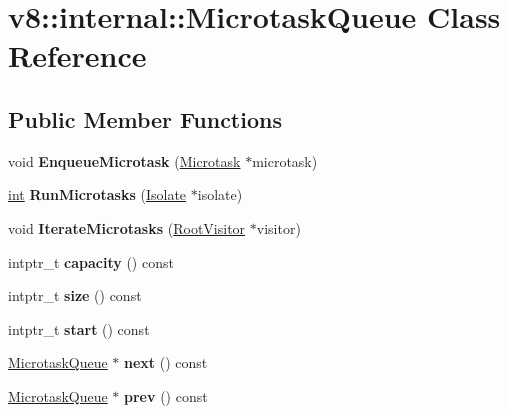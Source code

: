 \hypertarget{classv8_1_1internal_1_1MicrotaskQueue}{}\section{v8\+:\+:internal\+:\+:Microtask\+Queue Class Reference}
\label{classv8_1_1internal_1_1MicrotaskQueue}
\subsection*{Public Member Functions}
\begin{DoxyCompactItemize}
\item 
\mbox{\label{classv8_1_1internal_1_1MicrotaskQueue_a87e0bb654aeae8da494dfeb14d7a64e0}} 
void {\bfseries Enqueue\+Microtask} (\mbox{\hyperlink{classv8_1_1internal_1_1Microtask}{Microtask}} $\ast$microtask)
\item 
\mbox{\label{classv8_1_1internal_1_1MicrotaskQueue_aaa0dc3795c313ffa164da19dd50f4fc2}} 
\mbox{\hyperlink{classint}{int}} {\bfseries Run\+Microtasks} (\mbox{\hyperlink{classv8_1_1internal_1_1Isolate}{Isolate}} $\ast$isolate)
\item 
\mbox{\label{classv8_1_1internal_1_1MicrotaskQueue_a8d4d95ab5c39f431f2c7d2d98688beab}} 
void {\bfseries Iterate\+Microtasks} (\mbox{\hyperlink{classv8_1_1internal_1_1RootVisitor}{Root\+Visitor}} $\ast$visitor)
\item 
\mbox{\label{classv8_1_1internal_1_1MicrotaskQueue_a5cd348b62cdd9f017c609d039fcd1308}} 
intptr\+\_\+t {\bfseries capacity} () const
\item 
\mbox{\label{classv8_1_1internal_1_1MicrotaskQueue_a7209bf6df85bdc067b3dc73261ef355a}} 
intptr\+\_\+t {\bfseries size} () const
\item 
\mbox{\label{classv8_1_1internal_1_1MicrotaskQueue_aaa3648a97cbb8c0b94581d6404ee7c37}} 
intptr\+\_\+t {\bfseries start} () const
\item 
\mbox{\label{classv8_1_1internal_1_1MicrotaskQueue_ad1cf74a59544c1c8e84e6a1c617aad0b}} 
\mbox{\hyperlink{classv8_1_1internal_1_1MicrotaskQueue}{Microtask\+Queue}} $\ast$ {\bfseries next} () const
\item 
\mbox{\label{classv8_1_1internal_1_1MicrotaskQueue_a80d32341e84539e2a419cfa222bea2ba}} 
\mbox{\hyperlink{classv8_1_1internal_1_1MicrotaskQueue}{Microtask\+Queue}} $\ast$ {\bfseries prev} () const
\end{DoxyCompactItemize}
